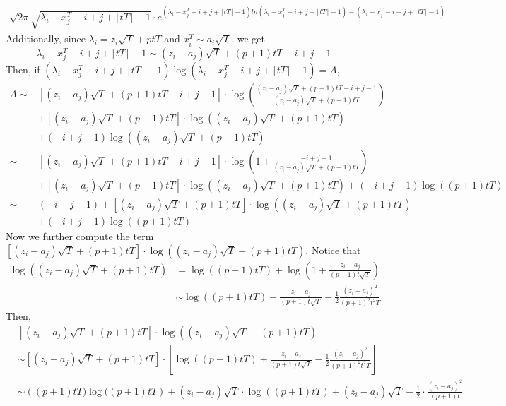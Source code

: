 \documentclass[12pt]{article}
\begin{document}
\begin{align*}
\sqrt{2\pi}\sqrt{\lambda_{i}-x_{j}^{T}-i+j+\lfloor tT \rfloor -1}\cdot  e^{(\lambda_{i}-x_{j}^{T}-i+j+\lfloor tT \rfloor -1)ln(\lambda_{i}-x_{j}^{T}-i+j+\lfloor tT \rfloor -1)-(\lambda_{i}-x_{j}^{T}-i+j+\lfloor tT \rfloor -1)}
\end{align*}
Additionally, since $\lambda_{i}=z_{i}\sqrt{T}+ptT$ and $x_{i}^{T}\sim a_{i}\sqrt{T}$, we get \[\lambda_{i}-x_{j}^{T}-i+j+\lfloor tT \rfloor -1\sim (z_{i}-a_{j})\sqrt{T} + (p+1)tT-i+j-1\]
Then,	if $(\lambda_{i}-x_{j}^{T}-i+j+\lfloor tT \rfloor -1)\log(\lambda_{i}-x_{j}^{T}-i+j+\lfloor tT \rfloor -1)=A$,
\begin{align*}
A\sim&\left[(z_{i}-a_{j})\sqrt{T}+(p+1)tT-i+j-1\right]\cdot\log\left(\frac{(z_{i}-a_{j})\sqrt{T}+(p+1)tT-i+j-1}{(z_{i}-a_{j})\sqrt{T}+(p+1)tT}\right)\\&+\left[(z_{i}-a_{j})\sqrt{T}+(p+1)tT\right]\cdot \log\left((z_{i}-a_{j})\sqrt{T}+(p+1)tT\right)\\
	& +(-i+j-1)\log\left((z_{i}-a_{j})\sqrt{T}+(p+1)tT\right)\\
	\sim & \left[(z_{i}-a_{j})\sqrt{T}+(p+1)tT-i+j-1\right]\cdot \log\left(1+\frac{-i+j-1}{(z_{i}-a_{j})\sqrt{T}+(p+1)tT}\right)\\
	& +\left[(z_{i}-a_{j})\sqrt{T}+(p+1)tT\right]\cdot
	\log\left((z_{i}-a_{j})\sqrt{T}+(p+1)tT\right)+ (-i+j-1)\log\left((p+1)tT\right)\\
	\sim&  \left(-i+j-1\right) + \left[(z_{i}-a_{j})\sqrt{T}+(p+1)tT\right]\cdot \log\left((z_{i}-a_{j})\sqrt{T}+(p+1)tT\right)\\&+(-i+j-1)\log\left((p+1)tT\right)
\end{align*}
Now we further compute the term $\left[(z_{i}-a_{j})\sqrt{T}+(p+1)tT\right]\cdot \log\left((z_{i}-a_{j})\sqrt{T}+(p+1)tT\right)$. Notice that
\begin{align*}
	\log\left((z_{i}-a_{j})\sqrt{T}+(p+1)tT\right)&= \log\left((p+1)tT\right)+\log\left(1+\frac{z_{i}-a_{j}}{(p+1)t\sqrt{T}}\right)\\
	&\sim \log((p+1)tT)+\frac{z_{i}-a_{j}}{(p+1)t\sqrt{T}}-\frac{1}{2}\frac{(z_{i}-a_{j})^2}{(p+1)^{2}t^{2}T}
\end{align*}
Then, 
\begin{align*}
	& \left[(z_{i}-a_{j})\sqrt{T}+(p+1)tT\right]\cdot \log\left((z_{i}-a_{j})\sqrt{T}+(p+1)tT\right)\\
	&\sim\left[(z_{i}-a_{j})\sqrt{T}+(p+1)tT\right]\cdot \left[\log((p+1)tT)+\frac{z_{i}-a_{j}}{(p+1)t\sqrt{T}}-\frac{1}{2}\frac{(z_{i}-a_{j})^2}{(p+1)^{2}t^{2}T}\right]\\
	&\sim \left((p+1)tT)\log((p+1)tT\right)+(z_{i}-a_{j})\sqrt{T}\cdot \log((p+1)tT)+(z_{i}-a_{j})\sqrt{T}-\frac{1}{2}\cdot\frac{(z_{i}-a_{j})^2}{(p+1)t}
\end{align*}
\end{document}
